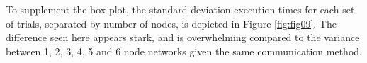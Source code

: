 To supplement the box plot, the standard deviation execution times for each set of trials, separated by number of nodes, is depicted in Figure \ref{fig:fig09}.  The difference seen here appears stark, and is overwhelming compared to the variance between 1, 2, 3, 4, 5 and 6 node networks given the same communication method. 

